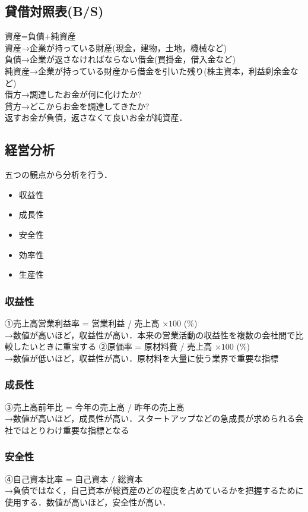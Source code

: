 \documentclass[a4paper,11pt]{ltjsarticle}
\begin{document}
\subsection{貸借対照表(B/S)}
資産=負債+純資産\\
資産→企業が持っている財産(現金，建物，土地，機械など)\\
負債→企業が返さなければならない借金(買掛金，借入金など)\\
純資産→企業が持っている財産から借金を引いた残り(株主資本，利益剰余金など)\\

借方→調達したお金が何に化けたか?\\
貸方→どこからお金を調達してきたか?\\
返すお金が負債，返さなくて良いお金が純資産．
\subsection{経営分析}
五つの観点から分析を行う．
\begin{itemize}
  \item 収益性
  \item 成長性
  \item 安全性
  \item 効率性
  \item 生産性
\end{itemize}
\subsubsection{収益性}
①売上高営業利益率 = 営業利益 / 売上高 $\times 100$ (\%)\\
→数値が高いほど，収益性が高い．本来の営業活動の収益性を複数の会社間で比較したいときに重宝する
②原価率 = 原材料費 / 売上高 $\times 100$ (\%)\\
→数値が低いほど，収益性が高い．原材料を大量に使う業界で重要な指標
\subsubsection{成長性}
③売上高前年比 = 今年の売上高 / 昨年の売上高\\
→数値が高いほど，成長性が高い．スタートアップなどの急成長が求められる会社ではとりわけ重要な指標となる
\subsubsection{安全性}
④自己資本比率 = 自己資本 / 総資本\\
→負債ではなく，自己資本が総資産のどの程度を占めているかを把握するために使用する．数値が高いほど，安全性が高い．
\end{document}
